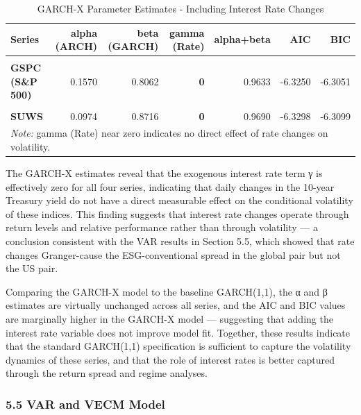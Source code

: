 \documentclass[
]{article}
\begin{document}
\begin{longtable}[t]{>{}lrr>{}rrrr}
\caption{\label{tab:garch-x-table}GARCH-X Parameter Estimates - Including Interest Rate Changes}\\
\toprule
Series & alpha (ARCH) & beta (GARCH) & gamma (Rate) & alpha+beta & AIC & BIC\\
\midrule
\textbf{\cellcolor{gray!10}{ESGU}} & \cellcolor{gray!10}{0.1569} & \cellcolor{gray!10}{0.8059} & \textbf{\cellcolor{gray!10}{0}} & \cellcolor{gray!10}{0.9629} & \cellcolor{gray!10}{-6.2894} & \cellcolor{gray!10}{-6.2695}\\
\textbf{GSPC (S\&P 500)} & 0.1570 & 0.8062 & \textbf{0} & 0.9633 & -6.3250 & -6.3051\\
\textbf{\cellcolor{gray!10}{IWDA}} & \cellcolor{gray!10}{0.1622} & \cellcolor{gray!10}{0.8043} & \textbf{\cellcolor{gray!10}{0}} & \cellcolor{gray!10}{0.9664} & \cellcolor{gray!10}{-6.6207} & \cellcolor{gray!10}{-6.6009}\\
\textbf{SUWS} & 0.0974 & 0.8716 & \textbf{0} & 0.9690 & -6.3298 & -6.3099\\
\bottomrule
\multicolumn{7}{l}{\rule{0pt}{1em}\textit{Note: } gamma (Rate) near zero indicates no direct effect of rate changes on volatility.}\\
\end{longtable}
\endgroup{}

The GARCH-X estimates reveal that the exogenous interest rate term γ is
effectively zero for all four series, indicating that daily changes in
the 10-year Treasury yield do not have a direct measurable effect on the
conditional volatility of these indices. This finding suggests that
interest rate changes operate through return levels and relative
performance rather than through volatility --- a conclusion consistent
with the VAR results in Section 5.5, which showed that rate changes
Granger-cause the ESG-conventional spread in the global pair but not the
US pair.

Comparing the GARCH-X model to the baseline GARCH(1,1), the α and β
estimates are virtually unchanged across all series, and the AIC and BIC
values are marginally higher in the GARCH-X model --- suggesting that
adding the interest rate variable does not improve model fit. Together,
these results indicate that the standard GARCH(1,1) specification is
sufficient to capture the volatility dynamics of these series, and that
the role of interest rates is better captured through the return spread
and regime analyses.

\subsubsection{5.5 VAR and VECM Model}\label{var-and-vecm-model}
\end{document}
